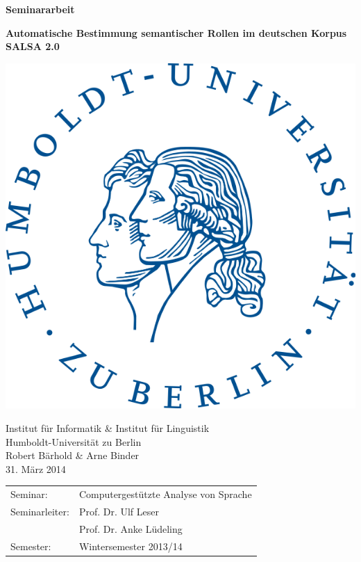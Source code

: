 \documentclass[12pt]{article}
\begin{document}
\thispagestyle{empty} 

\begin{center}
	\vspace*{\fill}
	
	\Huge{\textbf{Seminararbeit}}\\
	\vspace{1.5cm}
	
	\Large{\textbf{Automatische Bestimmung semantischer Rollen im deutschen
	Korpus SALSA 2.0}}\\
	\vspace{1cm}
		
	\includegraphics[scale=0.3]{images/logo_hu.png}
	\vspace{1cm}

	\begin{Large}
		Institut für Informatik \& Institut für Linguistik\\
		Humboldt-Universität zu Berlin\\
		\vspace{1.5cm}
		Robert Bärhold \& Arne Binder \\
		31. März 2014 \\ %
		\vspace{1cm}
		
		\begin{table}[h]
			\Large
			\centering
			\begin{tabular}{l l}
				Seminar: & Computergestützte Analyse von Sprache\\
				Seminarleiter: & Prof. Dr. Ulf Leser\\
				 		    & Prof. Dr. Anke Lüdeling \\
				Semester: & Wintersemester 2013/14 				 	
			\end{tabular}
		\end{table}	
	\end{Large}
	\vspace*{\fill}
\end{center}
\end{document}
